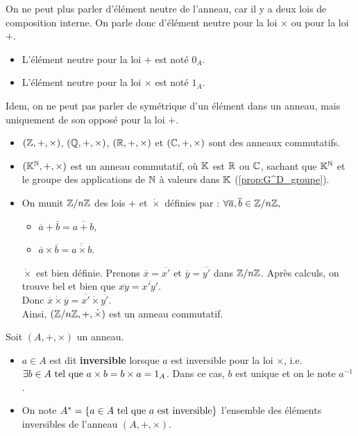 \documentclass[12pt, a4paper]{report}
\begin{document}
\begin{remark}
    On ne peut plus parler d'élément neutre de l'anneau, car il y a deux lois de composition interne. On parle donc d'élément neutre pour la loi $\times$ ou pour la loi $+$. 

    \begin{itemize}
        \item L'élément neutre pour la loi $+$ est noté $0_A$.
        \item L'élément neutre pour la loi $\times$ est noté $1_A$.
    \end{itemize}

    Idem, on ne peut pas parler de symétrique d'un élément dans un anneau, mais uniquement de son opposé pour la loi $+$.
\end{remark}

\begin{example}
    \begin{itemize}
        \item $(\mathbb{Z},+,\times)$, $(\mathbb{Q},+,\times)$, $(\mathbb{R},+,\times)$ et $(\mathbb{C},+,\times)$ sont des anneaux commutatifs.
        \item $(\mathbb{K}^{\mathbb{N}},+,\times)$ est un anneau commutatif, où $\mathbb{K}$ est $\mathbb{R}$ ou $\mathbb{C}$, sachant que $\mathbb{K}^{\mathbb{N}}$ et le groupe des applications de $\mathbb{N}$ à valeurs dans $\mathbb{K}$ (\ref{prop:G^D_groupe}).
        \item On munit $\mathbb{Z}/n\mathbb{Z}$ des lois $+$ et $\dot\times$ définies par : $\forall \overline{a}, \overline{b} \in \mathbb{Z}/n\mathbb{Z},$
        \begin{itemize}
            \item $\overline{a} + \overline{b} = \overline{a+b}$,
            \item $\overline{a} \times \overline{b} = \overline{a \dot\times b}$.
        \end{itemize}
        $\dot\times$ est bien définie. Prenons $\overline{x}=\overline{x'}$ et $\overline{y}=\overline{y'}$ dans $\mathbb{Z}/n\mathbb{Z}$. Après calculs, on trouve bel et bien que $\overline{xy}=\overline{x'y'}$.\\
        Donc $\overline{x}\dot\times\overline{y}=\overline{x'}\dot\times\overline{y'}$.\\
        Ainsi, $(\mathbb{Z}/n\mathbb{Z},+,\dot\times)$ est un anneau commutatif.
    \end{itemize}
\end{example}

\begin{property}
    Soit $(A,+,\times)$ un anneau.

    \begin{itemize}
        \item $a\in A$ est dit \textbf{inversible} lorsque $a$ est inversible pour la loi $\times$, i.e. $\exists b \in A \text{ tel que } a \times b = b \times a = 1_A$. Dans ce cas, $b$ est unique et on le note $a^{-1}$.
        \item On note $A^* = \{a \in A \text{ tel que } a \text{ est inversible}\}$ l'ensemble des éléments inversibles de l'anneau $(A,+,\times)$.
    \end{itemize}
\end{property}
\end{document}
